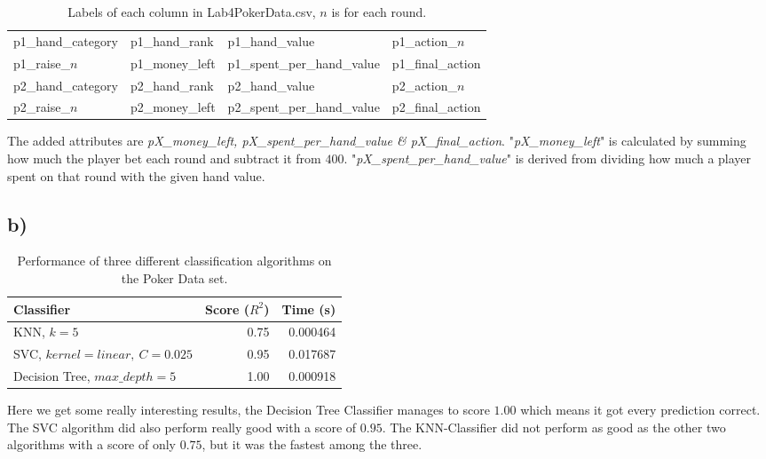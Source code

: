 \documentclass{article}
\begin{document}
            \begin{table}[H]
              \centering
              \label{tbl:task1f}
              \begin{tabular}{llll}
                \toprule
                p1\_hand\_category & p1\_hand\_rank &  p1\_hand\_value & p1\_action\_$n$ \\ p1\_raise\_$n$ & p1\_money\_left & p1\_spent\_per\_hand\_value & p1\_final\_action \\
                \midrule
                p2\_hand\_category & p2\_hand\_rank &  p2\_hand\_value & p2\_action\_$n$ \\ p2\_raise\_$n$ & p2\_money\_left & p2\_spent\_per\_hand\_value & p2\_final\_action \\
                \bottomrule
              \end{tabular}
              \caption{Labels of each column in Lab4PokerData.csv, $n$ is for each round.}
            \end{table}
            The added attributes are \textit{pX\_money\_left, pX\_spent\_per\_hand\_value \& pX\_final\_action}.
            "\textit{pX\_money\_left}" is calculated by summing how much the player bet each round and subtract it from $400$.
            "\textit{pX\_spent\_per\_hand\_value}" is derived from dividing how much a player spent on that round with the given hand value.
            
          \subsection{b)}
            \begin{table}[h]  
              \label{tbl:task2b}
              \centering
              \begin{tabular}{lrr}
                \toprule
                Classifier              &   Score ($R^2$)&  Time (s) \\
                \midrule
                KNN, $k=5$                    &   0.75 &  0.000464 \\
                SVC, $kernel=linear,~C=0.025$ &   0.95 &  0.017687 \\
                Decision Tree, $max\_depth=5$ &   1.00 &  0.000918 \\
                \bottomrule
              \end{tabular}
              \caption{Performance of three different classification algorithms on the Poker Data set.}
            \end{table}
            Here we get some really interesting results, the Decision Tree Classifier manages to score 
            $1.00$ which means it got every prediction correct. The SVC algorithm did also perform really good with
            a score of $0.95$. The KNN-Classifier did not perform as good as the other two algorithms with a score of
            only $0.75$, but it was the fastest among the three.
          
\end{document}
